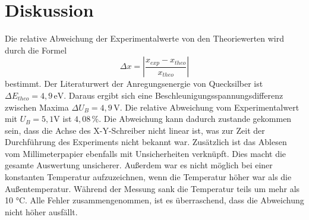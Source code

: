 \section{Diskussion}
\label{sec:Diskussion}
Die relative Abweichung der Experimentalwerte von 
den Theoriewerten wird durch die Formel 
$$\Delta x = \left|\frac{x_{exp} - x_{theo}}{x_{theo}} \right|$$
bestimmt. 
Der Literaturwert der Anregungsenergie von Quecksilber 
ist $\Delta E_{theo} = 4,9 \, \unit{\eV}$. Daraus ergibt 
sich eine Beschleunigungsspannungsdifferenz zwischen Maxima 
$\Delta U_B = 4,9 \, \unit{\volt}$. Die relative Abweichung 
vom Experimentalwert mit $U_B = 5,1 \unit{\volt}$ ist $4,08 \, \%$. 
Die Abweichung kann dadurch zustande gekommen sein, dass die Achse des X-Y-Schreiber 
nicht linear ist, was zur Zeit der Durchführung des Experiments nicht bekannt war. 
Zusätzlich ist das Ablesen 
vom Millimeterpapier ebenfalls mit Unsicherheiten verknüpft. 
Dies macht die gesamte Auswertung unsicherer. Außerdem war es nicht 
möglich bei einer konstanten Temperatur aufzuzeichnen, wenn die Temperatur 
höher war als die Außentemperatur. Während der Messung sank die Temperatur 
teils um mehr als 10 °C. Alle Fehler zusammengenommen, ist es überraschend, 
dass die Abweichung nicht höher ausfällt.